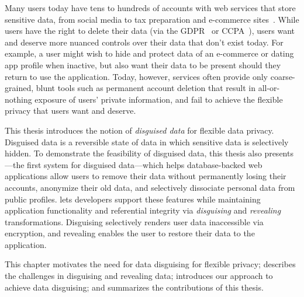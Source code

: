 Many users today have tens to hundreds of accounts with web services that store
sensitive data, from social media to tax preparation and e-commerce
sites~\cite{tens,hundreds,password_life_cycle}.
%
While users have the right to delete their data (via \eg the
GDPR~\cite{eu:gdpr} or CCPA~\cite{ccpa}), users want and deserve more nuanced
controls over their data that don't exist today.
%
For example, a user might wish to hide and protect data of an e-commerce or
dating app profile when inactive, but also want their data to be present should
they return to use the application. 
%
Today, however, services often provide only coarse-grained, blunt tools such as
permanent account deletion  that result
in all-or-nothing exposure of users' private information, and fail to achieve
the flexible privacy that users want and deserve.
%

%
This thesis introduces the notion of \emph{disguised data} for flexible data
privacy. Disguised data is a reversible state of data in which sensitive data is
selectively hidden.
%
To demonstrate the feasibility of disguised data, this thesis also presents
\sys---the first system for disguised data---which helps database-backed web applications allow users
to remove their data without permanently losing their accounts, anonymize their
old data, and selectively dissociate personal data from public profiles.
%
\sys lets developers support these features while maintaining application
functionality and referential integrity via \emph{disguising} and \emph{revealing}
transformations.
%
Disguising selectively renders user data inaccessible via encryption, and
revealing enables the user to restore their data to the application.
%
%

%
This chapter motivates the need for data disguising for flexible privacy;
describes the challenges in disguising and revealing data; introduces our
approach to achieve data disguising; and summarizes the contributions of this
thesis.

